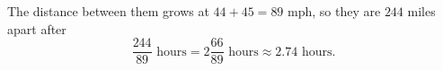 The distance between them grows at $44+45=89$ mph, so they are $244$ miles apart after
\[
\dfrac{244}{89}\text{ hours}=\boxed{2\dfrac{66}{89}\text{ hours}}\approx2.74\text{ hours}.
\]
